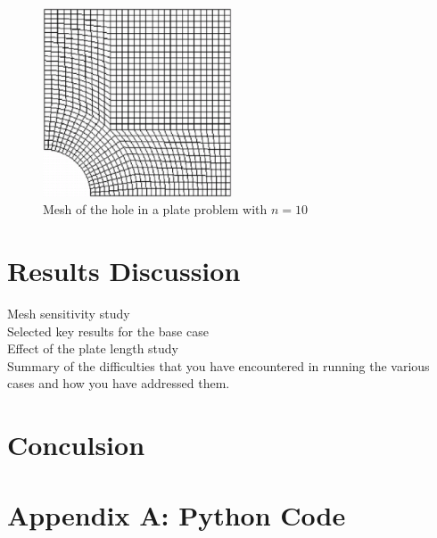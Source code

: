 \documentclass[twocolumn,10pt]{asme2ej}
\begin{document}
\begin{figure}[tb]
\begin{center}
\includegraphics[width=0.5\textwidth]{figure/user152x.png}
\caption{Mesh of the hole in a plate problem with $n = 10$}
\label{mesh}
\end{center}
\end{figure}

\section{Results Discussion}
\noindent Mesh sensitivity study\\
Selected key results for the base case\\
Effect of the plate length study\\
Summary of the difficulties that you have encountered in running the various cases and how you have addressed them.\\

\section{Conculsion}

\clearpage
\onecolumn
\appendix       %
\section*{Appendix A: Python Code}



\end{document}
